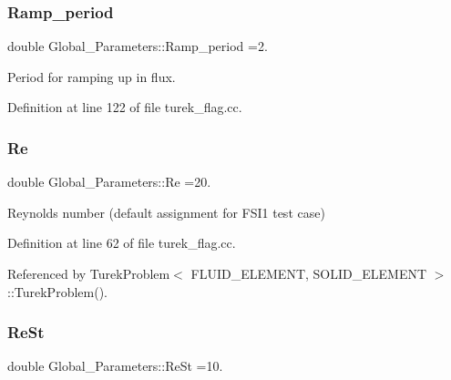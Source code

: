 \mbox{\label{namespaceGlobal__Parameters_af6afcca0b1ffdf88144f99cdfed18d3b}} 
\subsubsection{\texorpdfstring{Ramp\+\_\+period}{Ramp\_period}}
{\footnotesize\ttfamily double Global\+\_\+\+Parameters\+::\+Ramp\+\_\+period =2.}



Period for ramping up in flux. 



Definition at line 122 of file turek\+\_\+flag.\+cc.

\mbox{\label{namespaceGlobal__Parameters_a9d72e94a9305c6a310940a6a427ebe06}} 
\subsubsection{\texorpdfstring{Re}{Re}}
{\footnotesize\ttfamily double Global\+\_\+\+Parameters\+::\+Re =20.}



Reynolds number (default assignment for F\+S\+I1 test case) 



Definition at line 62 of file turek\+\_\+flag.\+cc.



Referenced by Turek\+Problem$<$ F\+L\+U\+I\+D\+\_\+\+E\+L\+E\+M\+E\+N\+T, S\+O\+L\+I\+D\+\_\+\+E\+L\+E\+M\+E\+N\+T $>$\+::\+Turek\+Problem().

\mbox{\label{namespaceGlobal__Parameters_a7a59a32365e87566069e458dc83bd18a}} 
\subsubsection{\texorpdfstring{Re\+St}{ReSt}}
{\footnotesize\ttfamily double Global\+\_\+\+Parameters\+::\+Re\+St =10.}



